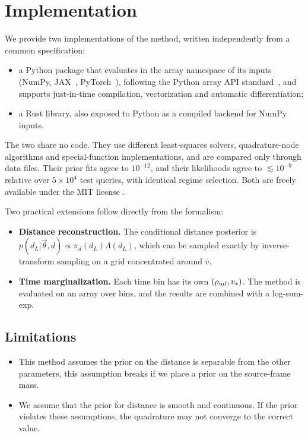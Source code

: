 \documentclass[prd,twocolumn,nofootinbib,superscriptaddress,amsmath,amssymb]{revtex4-2}
\newcommand{\rhomf}{\rho_{\rm mf}}
\newcommand{\vs}{v_\star}
\newcommand{\Lam}{\Lambda}
\begin{document}
\section{Implementation}
\label{sec:implementation}

We provide two implementations of the method,
written independently from a common specification:
\begin{itemize}
\item a Python package that evaluates in the array namespace of its inputs (NumPy,
JAX~\cite{Jax2018},
PyTorch~\cite{Paszke2019}),
following the Python array API standard~\cite{ArrayAPI},
and supports just-in-time compilation,
vectorization and automatic differentiation;
\item a Rust library,
also exposed to Python as a compiled backend for NumPy inputs.
\end{itemize}
The two share no code.
They use different least-squares solvers,
quadrature-node algorithms and special-function implementations,
and are compared only through data files.
Their prior fits agree to $10^{-12}$,
and their likelihoods agree to $\lesssim10^{-9}$ relative over $5\times10^4$ test queries,
with identical regime selection.
Both are freely available under the MIT license
\cite{distmarg_repo,distmarg_py,distmarg_rs_py,distmarg_crate}.

Two practical extensions follow directly from the formalism:
\begin{itemize}
\item \textbf{Distance reconstruction.} The conditional distance posterior is $p(d_L|\vec\theta,d)\propto\pi_d(d_L)\Lam(d_L)$,
which can be sampled exactly by inverse-transform sampling on a grid concentrated around $\bar v$.
\item \textbf{Time marginalization.} Each time bin has its own $(\rhomf,\vs)$.
The method is evaluated on an array over bins,
and the results are combined with a log-sum-exp.
\end{itemize}

\subsection{Limitations}

\begin{itemize}
\item This method assumes the prior on the distance is separable from the other parameters,
this assumption breaks if we place a prior on the source-frame mass.
\item We assume that the prior for distance is smooth and continuous.
If the prior violates these assumptions, the quadrature may not converge to the correct value.
\end{itemize}
\end{document}
